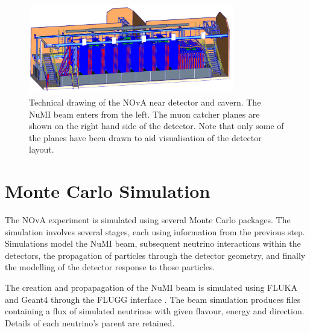 \begin{figure}
  \centering
  \includegraphics[width=0.8\textwidth]{../../img/baird/det/ND_01.png}
  \caption{Technical drawing of the NOvA near detector and 
    cavern. The NuMI beam enters from the left. The muon
    catcher planes are shown on the right hand side of the
    detector. Note that only some of the planes have been drawn to
    aid visualisation of the detector layout.} 
  \label{fig:neardet}
\end{figure}



\section{Monte Carlo Simulation}


The NOvA experiment is simulated using several Monte Carlo packages.
The simulation involves several stages, each using information
from the previous step. Simulations model the
NuMI beam, subsequent neutrino interactions within the detectors,
the propagation of particles through the detector geometry, and
finally the modelling of the detector response to those particles.

The creation and propapagation of the NuMI beam is simulated using FLUKA
and Geant4 through the FLUGG interface \cite{FLUKA, ferrari2005fluka,
  agostinelli2003geant4}. The beam simulation produces files
containing a flux of simulated neutrinos with given flavour, energy
and direction. Details of each neutrino's parent are retained.



